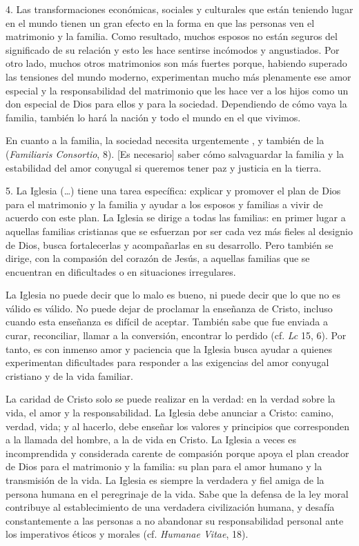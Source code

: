 \begin{body}
					4. Las transformaciones económicas, sociales y culturales que están teniendo lugar en el mundo tienen un gran efecto en la forma en que las personas ven el matrimonio y la familia. Como resultado, muchos esposos no están seguros del significado de su relación y esto les hace sentirse incómodos y angustiados. Por otro lado, muchos otros matrimonios son más fuertes porque, habiendo superado las tensiones del mundo moderno, experimentan mucho más plenamente ese amor especial y la responsabilidad del matrimonio que les hace ver a los hijos como un don especial de Dios para ellos y para la sociedad. Dependiendo de cómo vaya la familia, también lo hará la nación y todo el mundo en el que vivimos.
					
					En cuanto a la familia, la sociedad necesita urgentemente , y también de la  (\emph{Familiaris Consortio}, 8). {[}Es necesario{]} saber cómo salvaguardar la familia y la estabilidad del amor conyugal si queremos tener paz y justicia en la tierra.
					
					5. La Iglesia (\ldots{}) tiene una tarea específica: explicar y promover el plan de Dios para el matrimonio y la familia y ayudar a los esposos y familias a vivir de acuerdo con este plan. La Iglesia se dirige a todas las familias: en primer lugar a aquellas familias cristianas que se esfuerzan por ser cada vez más fieles al designio de Dios, busca fortalecerlas y acompañarlas en su desarrollo. Pero también se dirige, con la compasión del corazón de Jesús, a aquellas familias que se encuentran en dificultades o en situaciones irregulares.
					
					La Iglesia no puede decir que lo malo es bueno, ni puede decir que lo que no es válido es válido. No puede dejar de proclamar la enseñanza de Cristo, incluso cuando esta enseñanza es difícil de aceptar. También sabe que fue enviada a curar, reconciliar, llamar a la conversión, encontrar lo perdido (cf. \emph{Lc} 15, 6). Por tanto, es con inmenso amor y paciencia que la Iglesia busca ayudar a quienes experimentan dificultades para responder a las exigencias del amor conyugal cristiano y de la vida familiar.
					
					La caridad de Cristo solo se puede realizar en la verdad: en la verdad sobre la vida, el amor y la responsabilidad. La Iglesia debe anunciar a Cristo: camino, verdad, vida; y al hacerlo, debe enseñar los valores y principios que corresponden a la llamada del hombre, a la  de vida en Cristo. La Iglesia a veces es incomprendida y considerada carente de compasión porque apoya el plan creador de Dios para el matrimonio y la familia: su plan para el amor humano y la transmisión de la vida. La Iglesia es siempre la verdadera y fiel amiga de la persona humana en el peregrinaje de la vida. Sabe que la defensa de la ley moral contribuye al establecimiento de una verdadera civilización humana, y desafía constantemente a las personas a no abandonar su responsabilidad personal ante los imperativos éticos y morales (cf. \emph{Humanae Vitae}, 18).
					

\end{body}
